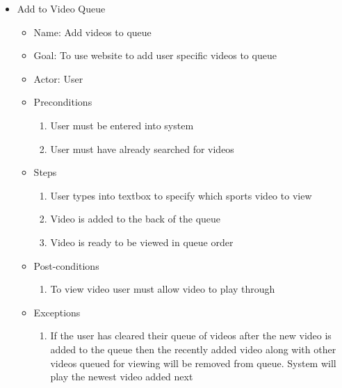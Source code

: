 \begin{itemize}
\item Add to Video Queue
	\begin{itemize}
	\item Name: Add videos to queue
    \item Goal: To use website to add user specific videos to queue
    \item Actor: User
    \item Preconditions
		\begin{enumerate}
		\item User must be entered into system
        \item User must have already searched for videos
        \end{enumerate}
    \item Steps
    	\begin{enumerate}
		\item User types into textbox to specify which sports video to view
        \item Video is added to the back of the queue
        \item Video is ready to be viewed in queue order
        \end{enumerate}
    \item Post-conditions
    	\begin{enumerate}
		\item To view video user must allow video to play through
        \end{enumerate}
    \item Exceptions
    	\begin{enumerate}
    	\item If the user has cleared their queue of videos after the new video is added to the queue then the recently added video along with other videos queued for viewing will be removed from queue. System will play the newest video added next
    	\end{enumerate}
    \end{itemize}
    

\end{itemize}

